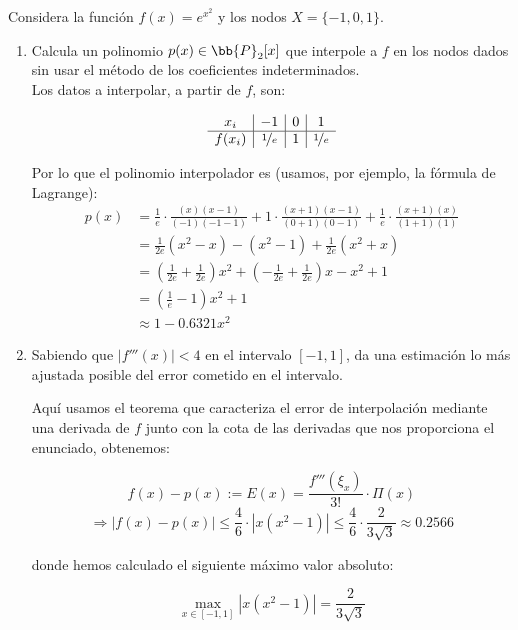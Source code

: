 \documentclass[12pt]{article}
\begin{document}
	\begin{ejercicio}
		Considera la función $f(x) = e^{x^2}$ y los nodos $X = \{-1, 0, 1\}$.
		
		\begin{enumerate}[label=\alph*)]
			\item Calcula un polinomio $p(x) \in \bb{P}_2[x]$ que interpole a $f$ en los nodos dados sin usar el método de los coeficientes indeterminados. \\
			
				Los datos a interpolar, a partir de $f$, son:
				
				$$
				\begin{array}{c|c|c|c}
					x_i & -1 & 0 & 1 \\
					\hline
					f(x_i) & \nicefrac{1}{e} & 1 & \nicefrac{1}{e}
				\end{array}
				$$
				
				Por lo que el polinomio interpolador es (usamos, por ejemplo, la fórmula de Lagrange):
				\begin{align*}
					p(x) &= \frac{1}{e} \cdot \frac{(x)(x - 1)}{(-1)(-1 - 1)} + 1 \cdot \frac{(x+1)(x - 1)}{(0+1)(0 - 1)} + \frac{1}{e} \cdot \frac{(x+1)(x)}{(1+1)(1)} \\
					&= \frac{1}{2e}(x^2 - x) - (x^2 - 1) + \frac{1}{2e}(x^2 + x) \\
					&= \left( \frac{1}{2e} + \frac{1}{2e} \right) x^2 + \left( -\frac{1}{2e} + \frac{1}{2e} \right) x - x^2 + 1\\
					&=\left( \frac{1}{e} - 1 \right) x^2 + 1\\
					&\approx 1 -0.6321x^2 
				\end{align*}
			
			\item Sabiendo que $|f'''(x)| < 4$ en el intervalo $[-1, 1]$, da una estimación lo más ajustada posible del error cometido en el intervalo.
			
				Aquí usamos el teorema que caracteriza el error de interpolación mediante una derivada de $f$ junto con la cota de las derivadas que nos proporciona el enunciado, obtenemos:
				
				$$ f(x) - p(x) := E(x) = \frac{f'''(\xi_x)}{3!} \cdot \Pi(x)$$
				$$ \Rightarrow |f(x) - p(x)| \leq \frac{4}{6} \cdot |x(x^2 - 1)| \leq \frac{4}{6} \cdot \frac{2}{3\sqrt{3}} \approx 0.2566$$
				
				donde hemos calculado el siguiente máximo valor absoluto:
				
				$$\max_{x \in [-1,1]} |x(x^2 - 1)| = \frac{2}{3\sqrt{3}}$$
			

\end{enumerate}
\end{ejercicio}
\end{document}
